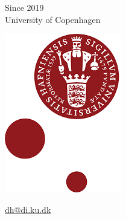 \documentclass[t,xcolor={svgnames,table}]{beamer}
\begin{document}
\begin{frame}
\begin{minipage}{.7\textwidth}
Since 2019 \\
University of Copenhagen
\end{minipage}
\begin{minipage}{.2\textwidth}
\includegraphics[width=\textwidth]{ku.png}
\end{minipage}

\vfill
{\Huge\url{dh@di.ku.dk}}
\end{frame}
\end{document}
